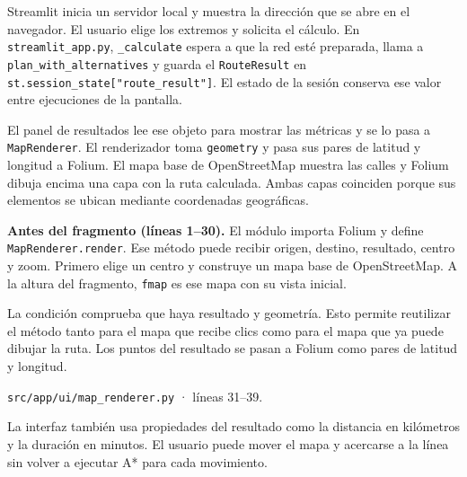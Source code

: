 \documentclass[11pt,a4paper]{article}
\begin{document}
Streamlit inicia un servidor local y muestra la dirección que se abre en el navegador. El usuario elige los extremos y solicita el cálculo. En \texttt{streamlit\_app.py}, \texttt{\_calculate} espera a que la red esté preparada, llama a \texttt{plan\_with\_alternatives} y guarda el \texttt{RouteResult} en \texttt{st.session\_state["route\_result"]}. El estado de la sesión conserva ese valor entre ejecuciones de la pantalla.

El panel de resultados lee ese objeto para mostrar las métricas y se lo pasa a \texttt{MapRenderer}. El renderizador toma \texttt{geometry} y pasa sus pares de latitud y longitud a Folium. El mapa base de OpenStreetMap muestra las calles y Folium dibuja encima una capa con la ruta calculada. Ambas capas coinciden porque sus elementos se ubican mediante coordenadas geográficas.

\textbf{Antes del fragmento (líneas 1--30).} El módulo importa Folium y define \texttt{MapRenderer.render}. Ese método puede recibir origen, destino, resultado, centro y zoom. Primero elige un centro y construye un mapa base de OpenStreetMap. A la altura del fragmento, \texttt{fmap} es ese mapa con su vista inicial.

La condición comprueba que haya resultado y geometría. Esto permite reutilizar el método tanto para el mapa que recibe clics como para el mapa que ya puede dibujar la ruta. Los puntos del resultado se pasan a Folium como pares de latitud y longitud.

\par\medskip
\noindent\begin{minipage}{\linewidth}
{\footnotesize\nolinkurl{src/app/ui/map_renderer.py} · líneas 31--39.\par}
\nopagebreak[4]
\end{minipage}\par

La interfaz también usa propiedades del resultado como la distancia en kilómetros y la duración en minutos. El usuario puede mover el mapa y acercarse a la línea sin volver a ejecutar A* para cada movimiento.
\end{document}
